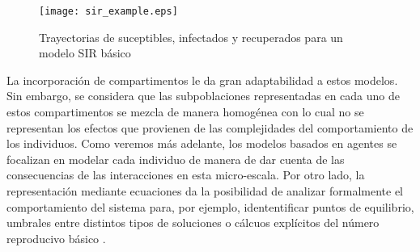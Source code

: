 \begin{figure}[h]
    \centering
    \texttt{[image: sir\_example.eps]}
    \caption{Trayectorias de suceptibles, infectados y recuperados para un modelo SIR básico}
    \label{fig:sir_example}
\end{figure}

La incorporación de compartimentos le da gran adaptabilidad a estos modelos. Sin embargo, se considera que las subpoblaciones representadas en cada uno de estos compartimentos se mezcla de manera homogénea con lo cual no se representan los efectos que provienen de las complejidades del comportamiento de los individuos. Como veremos más adelante, los modelos basados en agentes se focalizan en modelar cada individuo de manera de dar cuenta de las consecuencias de las interacciones en esta micro-escala. Por otro lado, la representación mediante ecuaciones da la posibilidad de analizar formalmente el comportamiento del sistema para, por ejemplo, idententificar puntos de equilibrio, umbrales entre distintos tipos de soluciones o cálcuos explícitos del número reproducivo básico \citep{Murray2007}.

